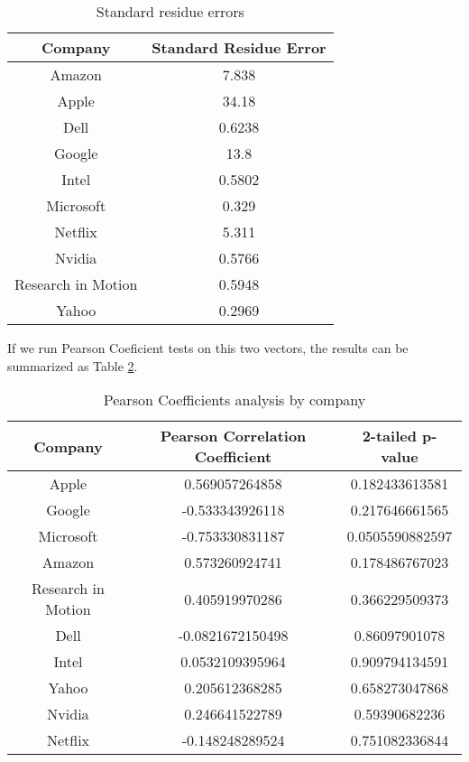 \documentclass[12pt]{article}
\begin{document}
\begin{table}
\begin{center}
    \begin{tabular}{ | c || c | }
        \hline
        \textbf{Company} & \textbf{Standard Residue Error} \\ \hline
        \hline
        Amazon & 7.838 \\ \hline
        Apple & 34.18 \\ \hline
        Dell & 0.6238 \\ \hline
        Google & 13.8 \\ \hline
        Intel & 0.5802 \\ \hline
        Microsoft & 0.329 \\ \hline
        Netflix & 5.311 \\ \hline
        Nvidia & 0.5766 \\ \hline
        Research in Motion & 0.5948 \\ \hline
        Yahoo & 0.2969 \\ \hline
    \end{tabular}
\caption{Standard residue errors}
\label{residue-errors}
\end{center}
\end{table}

If we run Pearson Coeficient tests on this two vectors, the results can be summarized as Table \ref{coefficients-by-company}.

\begin{table}
\begin{center}
    \begin{tabular}{ | c || c | c | }
        \hline
        \textbf{Company} & \textbf{Pearson Correlation Coefficient} & \textbf{2-tailed p-value} \\ \hline
        \hline
        Apple & 0.569057264858 & 0.182433613581 \\ \hline
        Google & -0.533343926118 & 0.217646661565 \\ \hline
        Microsoft & -0.753330831187 & 0.0505590882597 \\ \hline
        Amazon & 0.573260924741 & 0.178486767023 \\ \hline
        Research in Motion & 0.405919970286 & 0.366229509373 \\ \hline
        Dell & -0.0821672150498 & 0.86097901078 \\ \hline
        Intel & 0.0532109395964 & 0.909794134591 \\ \hline
        Yahoo & 0.205612368285 & 0.658273047868 \\ \hline
        Nvidia & 0.246641522789 & 0.59390682236 \\ \hline
        Netflix & -0.148248289524 & 0.751082336844 \\ \hline
    \end{tabular}
\caption{Pearson Coefficients analysis by company}
\label{coefficients-by-company}
\end{center}
\end{table}
\end{document}
